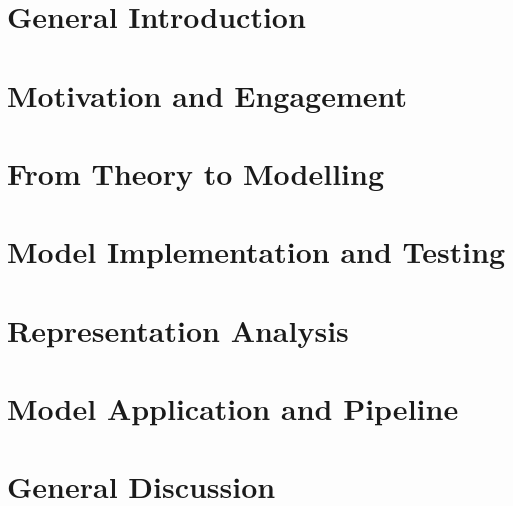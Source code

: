 \documentclass{yorkThesis}
\begin{document}

\contents


\chapter*{General Introduction}
\label{chapter_general_intro}


\chapter{Motivation and Engagement}
\label{chapter_lit_review}


\chapter{From Theory to Modelling}
\label{chapter_theory_modelling}


\chapter{Model Implementation and Testing}
\label{chapter_implementation_testing}


\chapter{Representation Analysis}
\label{chapter_repr_anal}


\chapter{Model Application and Pipeline}
\label{chapter_appliction}


\chapter{General Discussion}
\label{chapter_general_discussion}





\appendix




\end{document}
